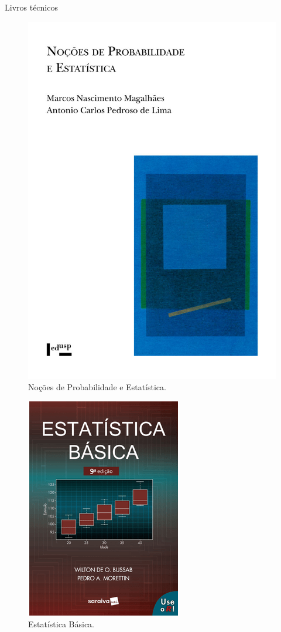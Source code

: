 \documentclass[
  ignorenonframetext,
  serif,
  professionalfont,
  usenames,
  dvipsnames,
  aspectratio = 169]{beamer}
\def\beginAHalfColumn{\begin{minipage}{0.49\textwidth}}%
\def\endColumns{\end{minipage}}%
\begin{document}
\begin{frame}{Livros técnicos}
\label{livros-tuxe9cnicos}
\beginAHalfColumn

\begin{figure}

{\centering \includegraphics[width=0.5\linewidth]{./img/noproest} 

}

\caption{Noções de Probabilidade e Estatística.}\label{fig:unnamed-chunk-13}
\end{figure}

\endColumns
\beginAHalfColumn

\begin{figure}

{\centering \includegraphics[width=0.5\linewidth]{./img/estbas} 

}

\caption{Estatística Básica.}\label{fig:unnamed-chunk-14}
\end{figure}

\endColumns
\end{frame}
\end{document}
